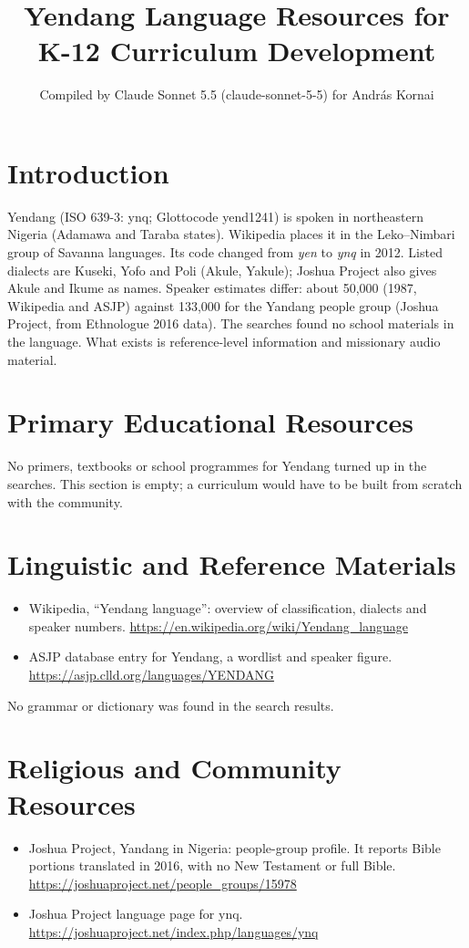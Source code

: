\documentclass[12pt]{article}
\title{Yendang Language Resources for K-12 Curriculum Development}
\author{Compiled by Claude Sonnet 5.5 (claude-sonnet-5-5) for Andr\'as Kornai}
\date{}
\begin{document}
\maketitle

\section{Introduction}
Yendang (ISO 639-3: ynq; Glottocode yend1241) is spoken in northeastern Nigeria (Adamawa and Taraba states). Wikipedia places it in the Leko--Nimbari group of Savanna languages. Its code changed from \emph{yen} to \emph{ynq} in 2012. Listed dialects are Kuseki, Yofo and Poli (Akule, Yakule); Joshua Project also gives Akule and Ikume as names. Speaker estimates differ: about 50,000 (1987, Wikipedia and ASJP) against 133,000 for the Yandang people group (Joshua Project, from Ethnologue 2016 data). The searches found no school materials in the language. What exists is reference-level information and missionary audio material.

\section{Primary Educational Resources}
No primers, textbooks or school programmes for Yendang turned up in the searches. This section is empty; a curriculum would have to be built from scratch with the community.

\section{Linguistic and Reference Materials}
\begin{itemize}
\item Wikipedia, ``Yendang language'': overview of classification, dialects and speaker numbers. \url{https://en.wikipedia.org/wiki/Yendang_language}
\item ASJP database entry for Yendang, a wordlist and speaker figure. \url{https://asjp.clld.org/languages/YENDANG}
\end{itemize}
No grammar or dictionary was found in the search results.

\section{Religious and Community Resources}
\begin{itemize}
\item Joshua Project, Yandang in Nigeria: people-group profile. It reports Bible portions translated in 2016, with no New Testament or full Bible. \url{https://joshuaproject.net/people_groups/15978}
\item Joshua Project language page for ynq. \url{https://joshuaproject.net/index.php/languages/ynq}
\end{itemize}
\end{document}
